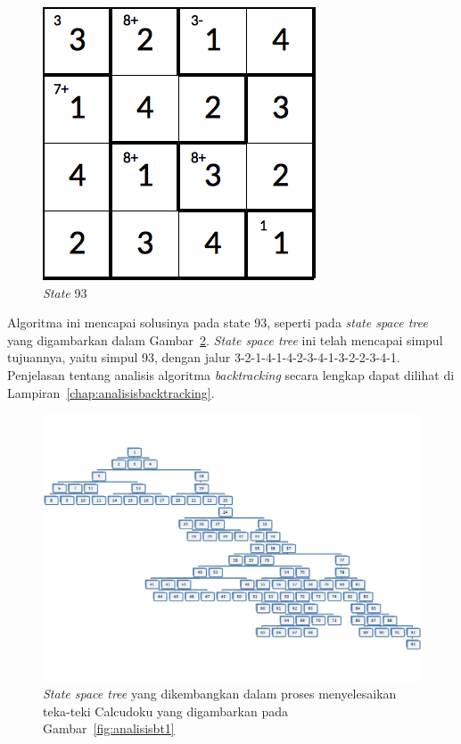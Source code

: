 \begin{enumerate}
\begin{figure}
\centering
\captionsetup{justification=centering}
\includegraphics[scale=0.333]{Gambar/backtracking/State93}
\caption[\textit{State} 93]{\textit{State} 93}
\label{fig:analisisbt32}
\end{figure}

\end{enumerate}

Algoritma ini mencapai solusinya pada state 93, seperti pada \textit{state space tree} yang digambarkan dalam Gambar~\ref{fig:analisisbt33}. \textit{State space tree} ini telah mencapai simpul tujuannya, yaitu simpul 93, dengan jalur 3-2-1-4-1-4-2-3-4-1-3-2-2-3-4-1. Penjelasan tentang analisis algoritma \textit{backtracking} secara lengkap dapat dilihat di Lampiran~\ref{chap:analisisbacktracking}.

\begin{landscape}
\begin{figure}
\centering
\captionsetup{justification=centering}
\includegraphics[scale=0.75]{Gambar/backtracking/StateSpaceTree}
\caption[\textit{State space tree} yang dikembangkan dalam proses menyelesaikan teka-teki Calcudoku yang digambarkan pada Gambar~\ref{fig:analisisbt1}]{\textit{State space tree} yang dikembangkan dalam proses menyelesaikan teka-teki Calcudoku yang digambarkan pada Gambar~\ref{fig:analisisbt1}}
\label{fig:analisisbt33}
\end{figure}
\end{landscape}

